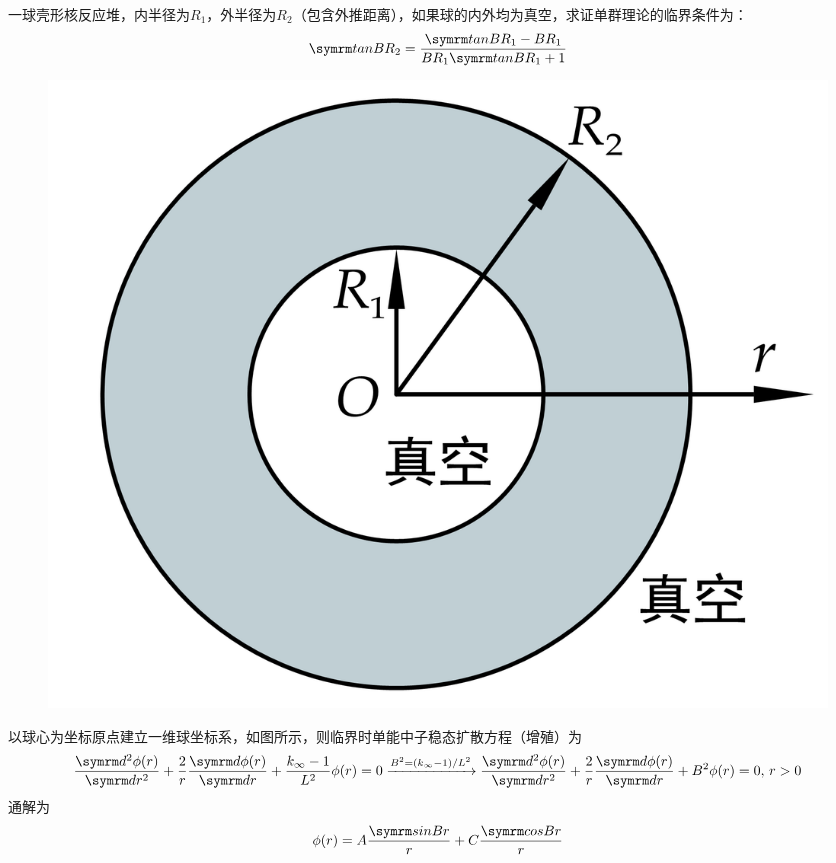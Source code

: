 \begin{exercise}
    一球壳形核反应堆，内半径为$R_1$，外半径为$R_2$（包含外推距离），如果球的内外均为真空，求证单群理论的临界条件为：
    \begin{equation*}
        \ntan BR_2 = \frac{\ntan BR_1 - BR_1}{BR_1\ntan BR_1 + 1}
    \end{equation*}
    \begin{solution}
        \begin{figure}[H]
            \centering
            \includegraphics[scale=1]{figures/fig4.8.png}
        \end{figure}
        以球心为坐标原点建立一维球坐标系，如图所示，则临界时单能中子稳态扩散方程（增殖）为
        \begin{equation*}
            \ddv{\phi(r)}{r} + \frac{2}{r} \dv{\phi(r)}{r} + \frac{k_{\infty} - 1}{L^2}\phi(r) = 0 \xrightarrow{B^2 = (k_{\infty} - 1)/L^2} \ddv{\phi(r)}{r} + \frac{2}{r} \dv{\phi(r)}{r} + B^2 \phi(r) = 0,\,r > 0
        \end{equation*}
        通解为
        \begin{equation*}
            \phi(r) = A\frac{\nsin Br}{r} + C\frac{\ncos Br}{r}
        \end{equation*}
        

\end{solution}
\end{exercise}
